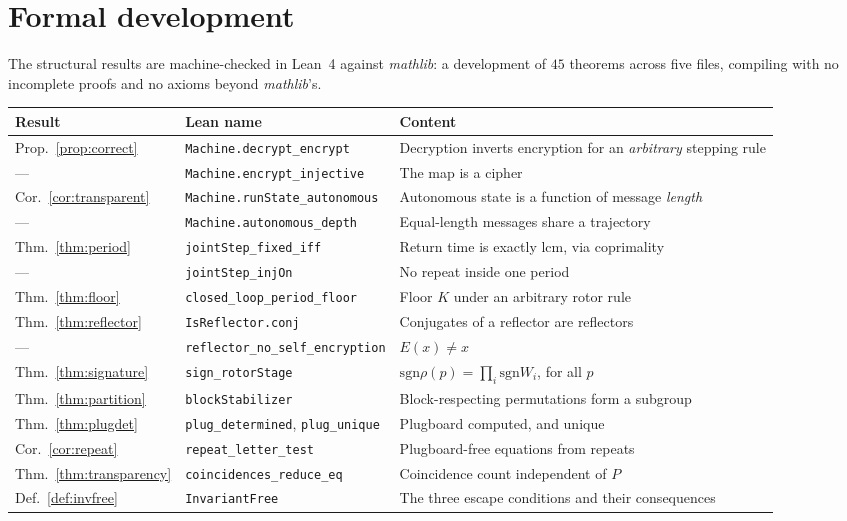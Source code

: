 \documentclass[11pt]{article}
\theoremstyle{definition}
\newcommand{\sgn}{\mathrm{sgn}}
\newcommand{\lean}[1]{{\small\texttt{#1}}}
\begin{document}
\section{Formal development}\label{sec:lean}

The structural results are machine-checked in Lean~4 against \emph{mathlib}: a
development of $45$ theorems across five files, compiling with no incomplete
proofs and no axioms beyond \emph{mathlib}'s.

\begin{center}
\small
\begin{tabular}{llp{6.1cm}}
\toprule
Result & Lean name & Content \\
\midrule
Prop.~\ref{prop:correct} & \lean{Machine.decrypt\_encrypt} & Decryption inverts encryption for an \emph{arbitrary} stepping rule \\
--- & \lean{Machine.encrypt\_injective} & The map is a cipher \\
Cor.~\ref{cor:transparent} & \lean{Machine.runState\_autonomous} & Autonomous state is a function of message \emph{length} \\
--- & \lean{Machine.autonomous\_depth} & Equal-length messages share a trajectory \\
Thm.~\ref{thm:period} & \lean{jointStep\_fixed\_iff} & Return time is exactly $\mathrm{lcm}$, via coprimality \\
--- & \lean{jointStep\_injOn} & No repeat inside one period \\
Thm.~\ref{thm:floor} & \lean{closed\_loop\_period\_floor} & Floor $K$ under an arbitrary rotor rule \\
Thm.~\ref{thm:reflector} & \lean{IsReflector.conj} & Conjugates of a reflector are reflectors \\
--- & \lean{reflector\_no\_self\_encryption} & $E(x)\neq x$ \\
Thm.~\ref{thm:signature} & \lean{sign\_rotorStage} & $\sgn\rho(p) = \prod_i \sgn W_i$, for all $p$ \\
Thm.~\ref{thm:partition} & \lean{blockStabilizer} & Block-respecting permutations form a subgroup \\
Thm.~\ref{thm:plugdet} & \lean{plug\_determined}, \lean{plug\_unique} & Plugboard computed, and unique \\
Cor.~\ref{cor:repeat} & \lean{repeat\_letter\_test} & Plugboard-free equations from repeats \\
Thm.~\ref{thm:transparency} & \lean{coincidences\_reduce\_eq} & Coincidence count independent of $P$ \\
Def.~\ref{def:invfree} & \lean{InvariantFree} & The three escape conditions and their consequences \\
\bottomrule
\end{tabular}
\end{center}
\end{document}
